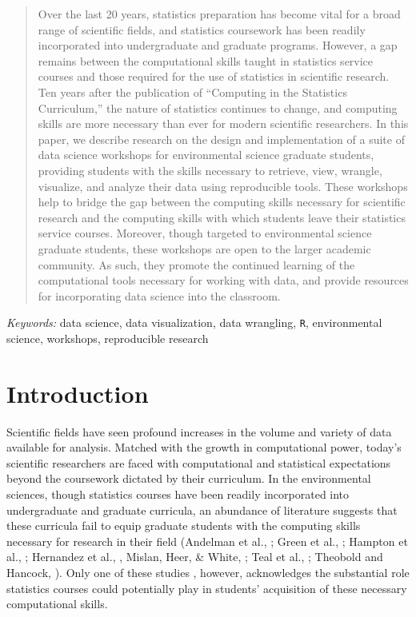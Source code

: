 \documentclass[12pt]{article}
\begin{document}
\begin{abstract}

\noindent Over the last 20 years, statistics preparation has become vital for a
broad range of scientific fields, and statistics coursework has been readily 
incorporated into undergraduate and graduate programs. However, a gap remains 
between the computational skills taught in statistics service courses and those
required for the use of statistics in scientific research. Ten years after the 
publication of ``Computing in the Statistics Curriculum,'' the nature of 
statistics continues to change, and computing skills are more necessary than 
ever for modern scientific researchers. In this paper, we describe research on 
the design and implementation of a suite of data science workshops for 
environmental science graduate students, providing students with the skills 
necessary to retrieve, view, wrangle, visualize, and analyze their data using 
reproducible tools. These workshops help to bridge the gap between the computing
skills necessary for scientific research and the computing skills with which
students leave their statistics service courses. Moreover, though
targeted to environmental science graduate students, these workshops are open to
the larger academic community. As such, they promote the continued learning of 
the computational tools necessary for working with data, and provide resources
for incorporating data science into the classroom.
\end{abstract}

\noindent %
{\it Keywords:} data science, data visualization, data wrangling, \texttt{R}, 
environmental science, workshops, reproducible research 

\vfill

\newpage
{}

\section{Introduction}
\label{sec:intro}

\noindent Scientific fields have seen profound increases in the volume and variety 
of data available for analysis. Matched with the growth in computational power, 
today's scientific researchers are faced with computational and statistical 
expectations beyond the coursework dictated by their curriculum. In the
environmental sciences, though statistics courses have been readily incorporated
into undergraduate and graduate curricula, an abundance of literature suggests 
that these curricula fail to equip graduate students with the computing skills 
necessary for research in their field (Andelman et al., \citeyear{andelman}; 
Green et al., \citeyear{green}; Hampton et al., \citeyear{hampton}; Hernandez et
al., \citeyear{hernandez}, Mislan, Heer, \& White, \citeyear{mislan}; Teal et 
al., \citeyear{carpentry}; Theobold and Hancock, \citeyear{theobold}). Only 
one of these studies \citep{theobold}, however, acknowledges the substantial 
role statistics courses could potentially play in students' acquisition of 
these necessary computational skills. 
\end{document}

